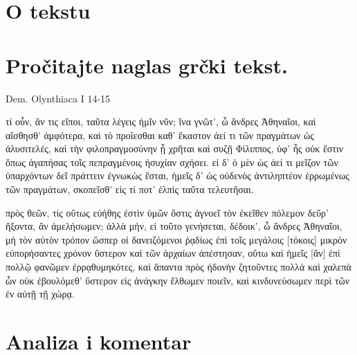 


\section*{O tekstu}



\section*{Pročitajte naglas grčki tekst.}

Dem. Olynthiaca I 14-15


\medskip


{\large

\begin{greek}

\noindent  τί οὖν, ἄν τις εἴποι, ταῦτα λέγεις ἡμῖν νῦν; ἵνα γνῶτ', ὦ ἄνδρες Ἀθηναῖοι, καὶ αἴσθησθ' ἀμφότερα, καὶ τὸ προΐεσθαι καθ' ἕκαστον ἀεί τι τῶν πραγμάτων ὡς ἀλυσιτελές, καὶ τὴν φιλοπραγμοσύνην ᾗ χρῆται καὶ συζῇ Φίλιππος, ὑφ' ἧς οὐκ ἔστιν ὅπως ἀγαπήσας τοῖς πεπραγμένοις ἡσυχίαν σχήσει. εἰ δ' ὁ μὲν ὡς ἀεί τι μεῖζον τῶν ὑπαρχόντων δεῖ πράττειν ἐγνωκὼς ἔσται, ἡμεῖς δ' ὡς οὐδενὸς ἀντιληπτέον ἐρρωμένως τῶν πραγμάτων, σκοπεῖσθ' εἰς τί ποτ' ἐλπὶς ταῦτα τελευτῆσαι.

πρὸς θεῶν, τίς οὕτως εὐήθης ἐστὶν ὑμῶν ὅστις ἀγνοεῖ τὸν ἐκεῖθεν πόλεμον δεῦρ' ἥξοντα, ἂν ἀμελήσωμεν; ἀλλὰ μήν, εἰ τοῦτο γενήσεται, δέδοικ', ὦ ἄνδρες Ἀθηναῖοι, μὴ τὸν αὐτὸν τρόπον ὥσπερ οἱ δανειζόμενοι ῥᾳδίως ἐπὶ τοῖς μεγάλοις [τόκοις] μικρὸν εὐπορήσαντες χρόνον ὕστερον καὶ τῶν ἀρχαίων ἀπέστησαν, οὕτω καὶ ἡμεῖς [ἂν] ἐπὶ πολλῷ φανῶμεν ἐρρᾳθυμηκότες, καὶ ἅπαντα πρὸς ἡδονὴν ζητοῦντες πολλὰ καὶ χαλεπὰ ὧν οὐκ ἐβουλόμεθ' ὕστερον εἰς ἀνάγκην ἔλθωμεν ποιεῖν, καὶ κινδυνεύσωμεν περὶ τῶν ἐν αὐτῇ τῇ χώρᾳ.

\end{greek}

}


\section*{Analiza i komentar}


{\large
\begin{greek}
\noindent 
\end{greek}
}

\begin{description}[noitemsep]


\end{description}




